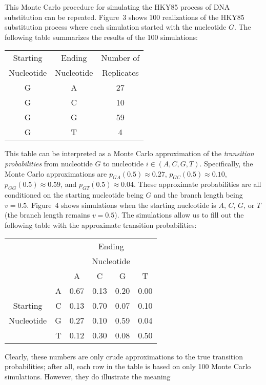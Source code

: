 \documentclass{svmult}
\begin{document}
This Monte Carlo procedure for simulating the HKY85 process of DNA substitution can be repeated. Figure~3 shows
100 realizations of the HKY85 substitution process where each simulation started with the nucleotide $G$. 
The following table summarizes the results of the
100 simulations:
\begin{center}
\begin{tabular}{ccc}
Starting & Ending & Number of \\
Nucleotide & Nucleotide &  Replicates \\ \hline
G & A & 27 \\
G & C & 10 \\
G & G & 59 \\
G & T & 4 \\
\end{tabular}
\end{center}
This table can be interpreted as a Monte Carlo approximation of the {\it transition probabilities} from nucleotide
$G$ to nucleotide $i \in (A,C,G,T)$. Specifically, the Monte Carlo approximations are 
$p_{GA}(0.5) \approx 0.27$, 
$p_{GC}(0.5) \approx 0.10$, 
$p_{GG}(0.5) \approx 0.59$, and
$p_{GT}(0.5) \approx 0.04$.
These approximate probabilities are all conditioned on the starting nucleotide being $G$ and the branch length
being $v = 0.5$. Figure~4 shows simulations
when the starting nucleotide is $A$, $C$, $G$, or $T$ (the branch length remains $v=0.5$). The simulations allow us to fill out the following table with the approximate
transition probabilities:
\begin{center}
\begin{tabular}{crcccc}
&    & \multicolumn{4}{c}{Ending} \\
&    & \multicolumn{4}{c}{Nucleotide} \\
                     &    & A  & C & G & T \\ \cline{2-6}
                     & A \vline & 0.67 & 0.13 & 0.20 & 0.00 \\
Starting       & C \vline & 0.13 & 0.70 & 0.07 & 0.10 \\
Nucleotide & G \vline & 0.27 & 0.10 & 0.59 & 0.04 \\
                     & T \vline & 0.12 & 0.30 & 0.08 & 0.50 \\ \cline{2-6}
\end{tabular}
\end{center}
Clearly, these numbers are only crude approximations to the true transition probabilities; after all, each row in the table is based on only 100 
Monte Carlo simulations. However, they do illustrate the meaning
\end{document}
